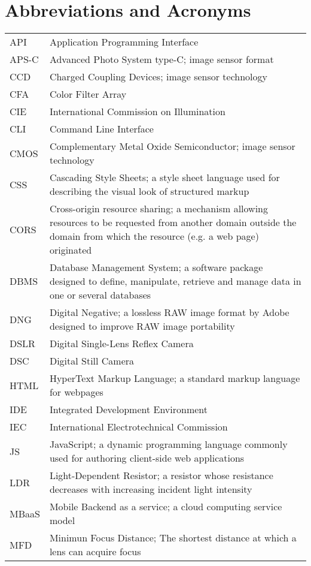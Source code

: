 \documentclass[thesis.tex]{subfiles}
\begin{document}
\chapter*{Abbreviations and Acronyms}

\noindent
\begin{longtable}{@{}p{}p{}@{}}
API & Application Programming Interface \\
APS-C & Advanced Photo System type-C; image sensor format \\
CCD & Charged Coupling Devices; image sensor technology \\
CFA & Color Filter Array \\
CIE & International Commission on Illumination \\
CLI & Command Line Interface \\
CMOS & Complementary Metal Oxide Semiconductor; image sensor technology \\
CSS & Cascading Style Sheets; a style sheet language used for describing the visual look of structured markup \\
CORS & Cross-origin resource sharing; a mechanism allowing resources to be requested from another domain outside the domain from which the resource (e.g. a web page) originated \\
DBMS & Database Management System; a software package designed to define, manipulate, retrieve and manage data in one or several databases \\
DNG & Digital Negative; a lossless RAW image format by Adobe designed to improve RAW image portability \\
DSLR & Digital Single-Lens Reflex Camera \\
DSC & Digital Still Camera \\
HTML & HyperText Markup Language; a standard markup language for webpages \\
IDE & Integrated Development Environment \\
IEC & International Electrotechnical Commission \\
JS & JavaScript; a dynamic programming language commonly used for authoring client-side web applications \\
LDR & Light-Dependent Resistor; a resistor whose resistance decreases with increasing incident light intensity \\
MBaaS & Mobile Backend as a service; a cloud computing service model \\
MFD & Minimun Focus Distance; The shortest distance at which a lens can acquire focus \\

\end{longtable}
\end{document}
